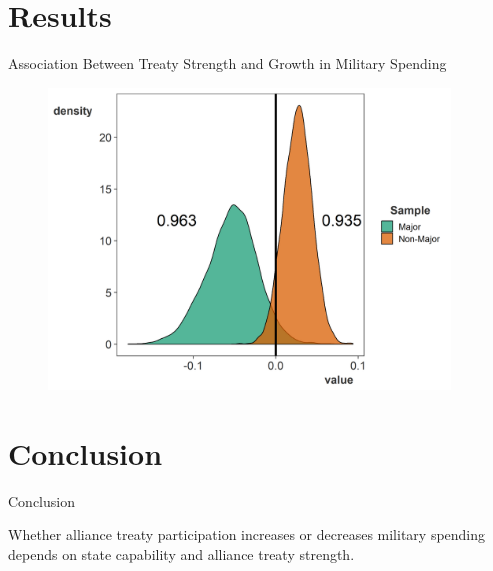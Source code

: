 \documentclass{beamer}
\begin{document}

\section{Results}


\begin{frame}{Association Between Treaty Strength and Growth in Military Spending} 

\begin{figure}
	\centering
		\includegraphics[width=0.95\textwidth]{str-post.png}
	\label{fig:str-post}
\end{figure}


\end{frame}





\section{Conclusion}


\begin{frame}{Conclusion}

Whether alliance treaty participation increases or decreases military spending depends on state capability and alliance treaty strength.  


\end{frame}
\end{document}
